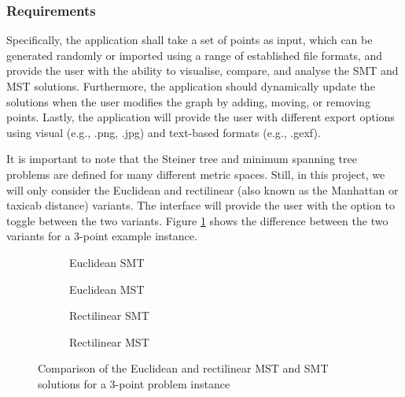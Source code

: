 \documentclass{l4proj}
\begin{document}
\subsubsection{Requirements}
Specifically, the application shall take a set of points as input, which can be generated randomly or imported using a range of established file formats, and provide the user with the ability to visualise, compare, and analyse the SMT and MST solutions.
Furthermore, the application should dynamically update the solutions when the user modifies the graph by adding, moving, or removing points.
Lastly, the application will provide the user with different export options using visual (e.g., .png, .jpg) and text-based formats (e.g., .gexf).

It is important to note that the Steiner tree and minimum spanning tree problems are defined for many different metric spaces. Still, in this project, we will only consider the Euclidean and rectilinear (also known as the Manhattan or taxicab distance) variants. The interface will provide the user with the option to toggle between the two variants. Figure \ref{fig:mst_rmst_3point} shows the difference between the two variants for a 3-point example instance.

\begin{figure}[htb]
    \begin{subfigure}[b]{0.24\textwidth}
        \centering
        
        \caption{Euclidean SMT}
    \end{subfigure}
    \begin{subfigure}[b]{0.24\textwidth}
        \centering
        
        \caption{Euclidean MST}
    \end{subfigure}
    \begin{subfigure}[b]{0.24\textwidth}
        \centering
        
        \caption{Rectilinear SMT}
    \end{subfigure}
    \begin{subfigure}[b]{0.24\textwidth}
        \centering
        
        \caption{Rectilinear MST}
    \end{subfigure}

    \caption{Comparison of the Euclidean and rectilinear MST and SMT solutions for a 3-point problem instance}
    \label{fig:mst_rmst_3point}
\end{figure}
\end{document}
